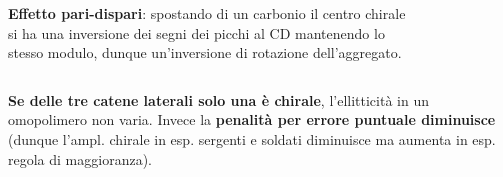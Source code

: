 \begin{frame}
\begin{columns}
 \textbf{Effetto pari-dispari}: spostando di un carbonio il centro chirale si ha una inversione dei segni dei picchi al CD mantenendo lo stesso modulo, dunque un'inversione di rotazione dell'aggregato.\vspace{-20pt}\begin{figure}{}\end{figure}\end{columns}\vspace{10pt} %
\textbf{Se delle tre catene laterali solo una è chirale}, l'ellitticità in un omopolimero non varia. Invece la \textbf{penalità per errore puntuale diminuisce} (dunque l'ampl. chirale in esp. sergenti e soldati diminuisce ma aumenta in esp. regola di maggioranza). \cite{tesi}
\end{frame}
\logo{}
